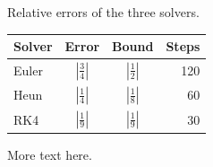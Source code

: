 \documentclass{article}
\begin{document}
Relative errors of the three solvers.

\begin{table}[h]\centering
\begin{tabular}{lccr}
\toprule
Solver & Error & Bound & Steps \\
\midrule
Euler & $\left|\frac{3}{4}\right|$ & $\left|\frac{1}{2}\right|$ & 120 \\[4pt]
Heun & $\left|\frac{1}{4}\right|$ & $\left|\frac{1}{8}\right|$ & 60 \\[4pt]
RK4 & $\left|\frac{1}{9}\right|$ & $\left|\frac{1}{9}\right|$ & 30 \\
\bottomrule
\end{tabular}
\end{table}
More text here.
\end{document}

